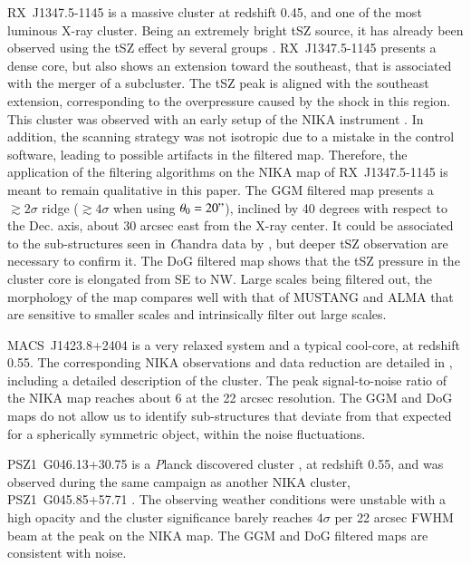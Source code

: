 \documentclass[twocolumn,traditabstract]{aa}
\begin{document}
\mbox{RX~J1347.5-1145} is a massive cluster at redshift 0.45, and one of the most luminous X-ray cluster. Being an extremely bright tSZ source, it has already been observed using the tSZ effect by several groups \citep[e.g.,][]{Pointecouteau1999,Komatsu1999,Mason2010,Plagge2012,Adam2014,Sayers2016,Kitayama2016}. \mbox{RX~J1347.5-1145} presents a dense core, but also shows an extension toward the southeast, that is associated with the merger of a subcluster. The tSZ peak is aligned with the southeast extension, corresponding to the overpressure caused by the shock in this region. This cluster was observed with an early setup of the NIKA instrument \citep[bandpass, sensitivity, calibration procedure, see][for more details]{Adam2014}. In addition, the scanning strategy was not isotropic due to a mistake in the control software, leading to possible artifacts in the filtered map. Therefore, the application of the filtering algorithms on the NIKA map of \mbox{RX~J1347.5-1145} is meant to remain qualitative in this paper. The GGM filtered map presents a $\gtrsim 2 \sigma$ ridge ($\gtrsim 4 \sigma$ when using $\theta_0 = 20"$), inclined by 40 degrees with respect to the Dec. axis, about 30 arcsec east from the X-ray center. It could be associated to the sub-structures seen in {\textit Chandra} data by \cite{Kreisch2016}, but deeper tSZ observation are necessary to confirm it. The DoG filtered map shows that the tSZ pressure in the cluster core is elongated from SE to NW. Large scales being filtered out, the morphology of the map compares well with that of MUSTANG \citep{Mason2010} and ALMA \citep{Kitayama2016} that are sensitive to smaller scales and intrinsically filter out large scales.

\mbox{MACS~J1423.8+2404} is a very relaxed system and a typical cool-core, at redshift 0.55. The corresponding NIKA observations and data reduction are detailed in \citep{Adam2016a}, including a detailed description of the cluster. The peak signal-to-noise ratio of the NIKA map reaches about 6 at the 22 arcsec resolution. The GGM and DoG maps do not allow us to identify sub-structures that deviate from that expected for a spherically symmetric object, within the noise fluctuations.

\mbox{PSZ1~G046.13+30.75} is a {\textit Planck} discovered cluster \citep{PlanckXXIX2014}, at redshift 0.55, and was observed during the same campaign as another NIKA cluster, \mbox{PSZ1~G045.85+57.71} \citep[see][for more details]{Ruppin2016}. The observing weather conditions were unstable with a high opacity and the cluster significance barely reaches $4 \sigma$ per 22 arcsec FWHM beam at the peak on the NIKA map. The GGM and DoG filtered maps are consistent with noise.
\end{document}
